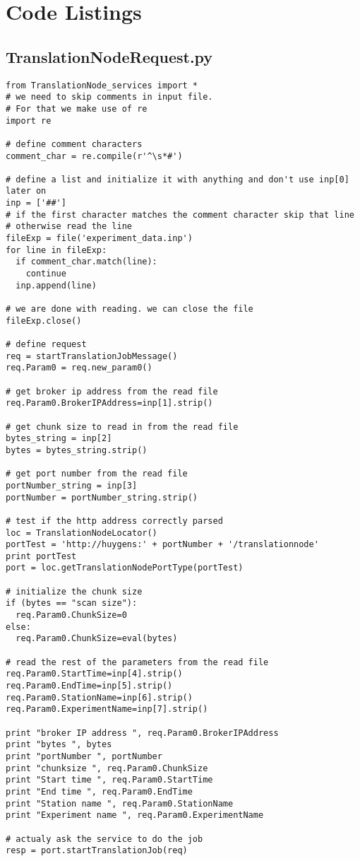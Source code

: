 \section{Code Listings}\label{codes}

\subsection{TranslationNodeRequest.py}
\begin{verbatim}
from TranslationNode_services import *
# we need to skip comments in input file.
# For that we make use of re
import re

# define comment characters
comment_char = re.compile(r'^\s*#')

# define a list and initialize it with anything and don't use inp[0] later on 
inp = ['##']
# if the first character matches the comment character skip that line
# otherwise read the line
fileExp = file('experiment_data.inp')
for line in fileExp:
  if comment_char.match(line):
    continue
  inp.append(line)

# we are done with reading. we can close the file
fileExp.close()

# define request
req = startTranslationJobMessage()
req.Param0 = req.new_param0()  

# get broker ip address from the read file
req.Param0.BrokerIPAddress=inp[1].strip()

# get chunk size to read in from the read file
bytes_string = inp[2]
bytes = bytes_string.strip()

# get port number from the read file
portNumber_string = inp[3]
portNumber = portNumber_string.strip()

# test if the http address correctly parsed
loc = TranslationNodeLocator()
portTest = 'http://huygens:' + portNumber + '/translationnode'
print portTest
port = loc.getTranslationNodePortType(portTest)

# initialize the chunk size
if (bytes == "scan size"):
  req.Param0.ChunkSize=0
else: 
  req.Param0.ChunkSize=eval(bytes) 

# read the rest of the parameters from the read file
req.Param0.StartTime=inp[4].strip()
req.Param0.EndTime=inp[5].strip()
req.Param0.StationName=inp[6].strip()
req.Param0.ExperimentName=inp[7].strip()

print "broker IP address ", req.Param0.BrokerIPAddress
print "bytes ", bytes
print "portNumber ", portNumber
print "chunksize ", req.Param0.ChunkSize
print "Start time ", req.Param0.StartTime
print "End time ", req.Param0.EndTime
print "Station name ", req.Param0.StationName
print "Experiment name ", req.Param0.ExperimentName

# actualy ask the service to do the job
resp = port.startTranslationJob(req)
\end{verbatim} 

